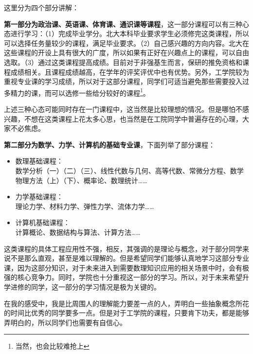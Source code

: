 \documentclass[11pt,oneside]{book}
\begin{document}
这里分为四个部分讲解：

\vspace{10pt}

\textbf{第一部分为政治课、英语课、体育课、通识课等课程}，这一部分课程可以有三种心态进行学习：（1）完成毕业学分。北大本科毕业要求学生必须修完这类课程，所以可以选择任务量较少的课程，满足毕业要求。（2）自己感兴趣的方向内容。北大在这些课程的开设上具有很大的广度，所以如果有正好在兴趣点上的课程，可以自由选取。（3）通过这类课程提高成绩。目前对于非强基生而言，保研的推免资格和课程成绩相关。且课程成绩越高，在学年的评奖评优中也有优势。另外，工学院较为重视专业课的学习成绩，所以对于这部分课程，同学们可适当避免那些需要投入过多精力的课，而可以选修一些给分较好的课程\footnote{当然，也会比较难抢上}。

\vspace{10pt}

上述三种心态可能同时存在一门课程中，这当然是比较理想的情况。但是哪怕不感兴趣，不想在这类课程上花太多心思，也当然是在工院同学中普遍存在的心理，大家不必焦虑。

\vspace{10pt}

\textbf{第二部分为数学、力学、计算机的基础专业课}，下面列举了部分课程：
\begin{itemize}
	\item 数理基础课程：\\数学分析（一）（二）（三）、线性代数与几何、高等代数、常微分方程、数学物理方法（上）（下）、概率论、数理统计……
	\item 力学基础课程：\\理论力学、材料力学、弹性力学、流体力学……
	\item 计算机基础课程：\\计算概论、数据结构与算法、计算方法……
\end{itemize}

这类课程的具体工程应用性不强，相反，其强调的是理论与概念，对于部分同学来说不是那么直观，甚至是难以理解的。但是希望同学们能够认真地学习这部分专业课，因为这部分知识，对于未来进入到需要数理知识应用的相关场景中时，会有极强的核心竞争力。同时，学院也十分重视这一部分的学习。所以，对于未来希望升学进修的同学，这一部分的学习情况是极为关键的。

\vspace{10pt}

在我的感受中，我是比周围人的理解能力要差一点的人，弄明白一些抽象概念所花的时间比优秀的同学要多一点。但是对于工学院的课程，只要肯下功夫，都是能够弄明白的，所以同学们也需要有自信心。

\vspace{10pt}
\end{document}
